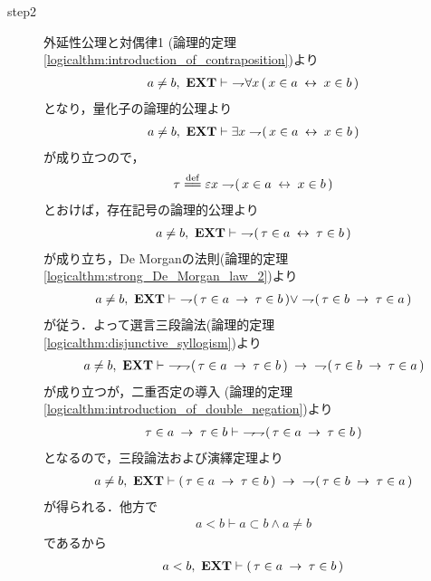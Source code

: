 \begin{prf}
\begin{description}
			\item[step2]
				外延性公理と対偶律1 
				(論理的定理\ref{logicalthm:introduction_of_contraposition})より
				\begin{align}
					a \neq b,\ \mbox{{\bf EXT}} \vdash\ \rightharpoondown\hspace{-0.25em}\forall x\, (\, x \in a \hspace{0.25em}\leftrightarrow\hspace{0.25em} x \in b\, )
				\end{align}
				となり，量化子の論理的公理より
				\begin{align}
					a \neq b,\ \mbox{{\bf EXT}} \vdash \exists x \rightharpoondown\hspace{-0.25em} (\, x \in a \hspace{0.25em}\leftrightarrow\hspace{0.25em} x \in b\, )
				\end{align}
				が成り立つので，
				\begin{align}
					\tau \defeq \varepsilon x \negation (\, x \in a \lrarrow x \in b\, )
				\end{align}
				とおけば，存在記号の論理的公理より
				\begin{align}
					a \neq b,\ \mbox{{\bf EXT}} \vdash\ \rightharpoondown\hspace{-0.25em} (\, \tau \in a \hspace{0.25em}\leftrightarrow\hspace{0.25em} \tau \in b\, )
				\end{align}
				が成り立ち，De Morganの法則(論理的定理\ref{logicalthm:strong_De_Morgan_law_2})より
				\begin{align}
					a \neq b,\ \mbox{{\bf EXT}} \vdash\ \rightharpoondown\hspace{-0.25em} (\, \tau \in a \hspace{0.25em}\rightarrow\hspace{0.25em} \tau \in b\, ) \vee
					\rightharpoondown\hspace{-0.25em} (\, \tau \in b \hspace{0.25em}\rightarrow\hspace{0.25em} \tau \in a\, )
				\end{align}
				が従う．よって選言三段論法(論理的定理\ref{logicalthm:disjunctive_syllogism})より
				\begin{align}
					a \neq b,\ \mbox{{\bf EXT}} \vdash\ \rightharpoondown\hspace{-0.25em} \rightharpoondown\hspace{-0.25em} (\, \tau \in a \hspace{0.25em}\rightarrow\hspace{0.25em} \tau \in b\, )
					\hspace{0.25em}\rightarrow\hspace{0.25em}\ \rightharpoondown\hspace{-0.25em} (\, \tau \in b \hspace{0.25em}\rightarrow\hspace{0.25em} \tau \in a\, )
				\end{align}
				が成り立つが，二重否定の導入
				(論理的定理\ref{logicalthm:introduction_of_double_negation})より
				\begin{align}
					\tau \in a \hspace{0.25em}\rightarrow\hspace{0.25em} \tau \in b \vdash\ \rightharpoondown\hspace{-0.25em} \rightharpoondown\hspace{-0.25em} (\, \tau \in a \hspace{0.25em}\rightarrow\hspace{0.25em} \tau \in b\, )
				\end{align}
				となるので，三段論法および演繹定理より
				\begin{align}
					a \neq b,\ \mbox{{\bf EXT}} \vdash (\, \tau \in a \hspace{0.25em}\rightarrow\hspace{0.25em} \tau \in b\, )
					\hspace{0.25em}\rightarrow\hspace{0.25em}\ \rightharpoondown\hspace{-0.25em} (\, \tau \in b \hspace{0.25em}\rightarrow\hspace{0.25em} \tau \in a\, )
				\end{align}
				が得られる．他方で
				\begin{align}
					a < b \vdash a \subset b \wedge a \neq b
				\end{align}
				であるから
				\begin{align}
					a < b,\ \EXTAX \vdash (\, \tau \in a \rarrow \tau \in b\, )

\end{align}
\end{description}
\end{prf}
